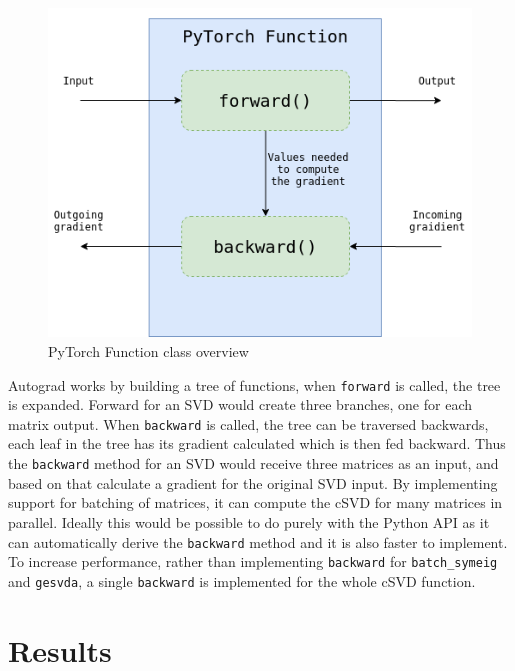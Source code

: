 \begin{figure}[H]
    \centering
    \includegraphics[scale=0.45]{Figures/pytorch_function.png}
    \caption{PyTorch Function class overview}
    \label{fig:pytorch:function}
\end{figure}

Autograd works by building a tree of functions, when \texttt{forward} is called, the tree is expanded. Forward for an SVD would create three branches, one for each matrix output. When \texttt{backward} is called, the tree can be traversed backwards, each leaf in the tree has its gradient calculated which is then fed backward. Thus the \texttt{backward} method for an SVD would receive three matrices as an input, and based on that calculate a gradient for the original SVD input. By implementing support for batching of matrices, it can compute the cSVD for many matrices in parallel. Ideally this would be possible to do purely with the Python API as it can automatically derive the \texttt{backward} method and it is also faster to implement. To increase performance, rather than implementing \texttt{backward} for \texttt{batch\_symeig} and \texttt{gesvda}, a single \texttt{backward} is implemented for the whole cSVD function.

\section{Results}

